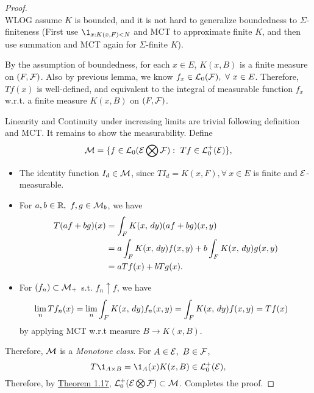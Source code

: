 \begin{proof}\ \\

WLOG assume $K$ is bounded, and it is not hard to generalize boundedness to $\Sigma$-finiteness (First use $\1_{x: K(x,F) < N}$ and MCT to approximate finite $K$, and then use summation and MCT again for $\Sigma$-finite $K$). 

\np By the assumption of boundedness, for each $x \in E$, $K(x, B)$ is a finite measure on $(F,\mathcal{F})$. Also by previous lemma, we know $f_x \in \mathcal{L}_0(\mathcal{F}),\ \forall\ x \in E$. Therefore, $Tf(x)$ is well-defined, and equivalent to the integral of measurable function $f_x$ w.r.t. a finite measure $K(x,B)$ on $(F,\mathcal{F})$.

\np Linearity and Continuity under increasing limits are trivial following definition and MCT. It remains to show the measurability. Define
\begin{equation*}
    \mathcal{M} = \{f \in \mathcal{L}_0(\mathcal{E} \bigotimes \mathcal{F}):\ Tf \in \mathcal{L}_0^+(\mathcal{E})\},
\end{equation*}
\begin{itemize}
    \item The identity function $I_d \in \mathcal{M}$, since $T I_d = K(x,F), \forall\ x \in E$ is finite and $\mathcal{E}$-measurable.
    \item For $a,b \in \mathbb{R},\ f,g \in \mathcal{M}_b$, we have
    \begin{align*}
        T(af + bg)(x) &= \int_F K(x,\,dy) (af + bg)(x,y)\\
        &= a\int_F K(x,\,dy) f(x,y) + b  \int_F K(x,\,dy) g(x,y)\\
        &= a Tf(x) + b Tg(x).
    \end{align*}
    \item For $(f_n) \subset \mathcal{M}_+$ s.t. $f_n \uparrow f$, we have
    \begin{align*}
        \lim_n Tf_n(x) &= \lim_n \int_F K(x,\,dy) f_n(x,y) = \int_F K(x,\,dy) f(x,y) = Tf(x)
    \end{align*}
    by applying MCT w.r.t measure $B \to K(x,B)$.
\end{itemize}
Therefore, $\mathcal{M}$ is a \textit{Monotone class}. For $A \in \mathcal{E},\ B \in \mathcal{F}$,
\begin{equation*}
    T \1_{A \times B} = \1_A (x) K(x, B) \in \Ls_0^+(\Es),
\end{equation*}
Therefore, by \hyperref[1.17]{Theorem 1.17}, $\mathcal{L}_0^+(\mathcal{E} \bigotimes \mathcal{F}) \subset \mathcal{M}$. Completes the proof.
\end{proof}



